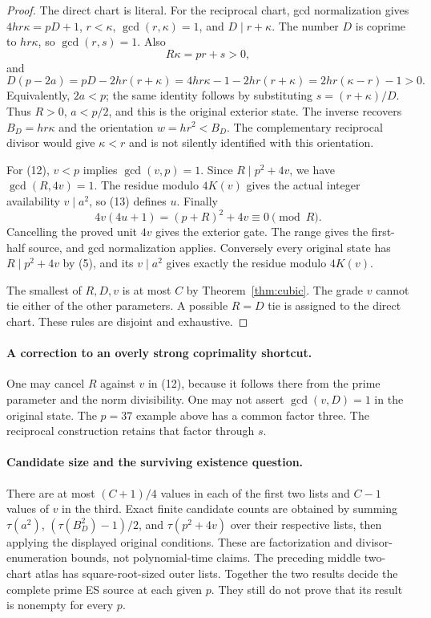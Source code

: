 \begin{proof}
The direct chart is literal. For the reciprocal chart, gcd normalization gives
$4hr\kappa=pD+1$, $r<\kappa$, $\gcd(r,\kappa)=1$, and
$D\mid r+\kappa$. The number $D$ is coprime to $hr\kappa$, so
$\gcd(r,s)=1$. Also
\[
 R\kappa=pr+s>0,
\]
and
\[
 D(p-2a)=pD-2hr(r+\kappa)
 =4hr\kappa-1-2hr(r+\kappa)
 =2hr(\kappa-r)-1>0.
\]
Equivalently, $2a<p$; the same identity follows by substituting
$s=(r+\kappa)/D$. Thus $R>0$, $a<p/2$, and this is the original exterior state.
The inverse recovers $B_D=hr\kappa$ and the orientation $w=hr^2<B_D$.
The complementary reciprocal divisor would give $\kappa<r$ and is not silently
identified with this orientation.

For (12), $v<p$ implies $\gcd(v,p)=1$. Since $R\mid p^2+4v$, we have
$\gcd(R,4v)=1$. The residue modulo $4K(v)$ gives the actual integer availability
$v\mid a^2$, so (13) defines $u$. Finally
\[
 4v(4u+1)=(p+R)^2+4v\equiv0\pmod R.
\]
Cancelling the proved unit $4v$ gives the exterior gate. The range gives the
first-half source, and gcd normalization applies. Conversely every original
state has $R\mid p^2+4v$ by (5), and its $v\mid a^2$ gives exactly the residue
modulo $4K(v)$.

The smallest of $R,D,v$ is at most $C$ by Theorem~\ref{thm:cubic}.
The grade $v$ cannot tie either of the other parameters. A possible $R=D$ tie is
assigned to the direct chart. These rules are disjoint and exhaustive.
\end{proof}

\paragraph{A correction to an overly strong coprimality shortcut.}
One may cancel $R$ against $v$ in (12), because it follows there from the
prime parameter and the norm divisibility. One may not assert
$\gcd(v,D)=1$ in the original state. The $p=37$ example above has a common
factor three. The reciprocal construction retains that factor through $s$.

\paragraph{Candidate size and the surviving existence question.}
There are at most $(C+1)/4$ values in each of the first two lists and $C-1$
values of $v$ in the third. Exact finite candidate counts are obtained by summing
$\tau(a^2)$, $(\tau(B_D^2)-1)/2$, and $\tau(p^2+4v)$ over their respective
lists, then applying the displayed original conditions. These are factorization
and divisor-enumeration bounds, not polynomial-time claims. The preceding
middle two-chart atlas has square-root-sized outer lists. Together the two
results decide the complete prime ES source at each given $p$. They still do
not prove that its result is nonempty for every $p$.

